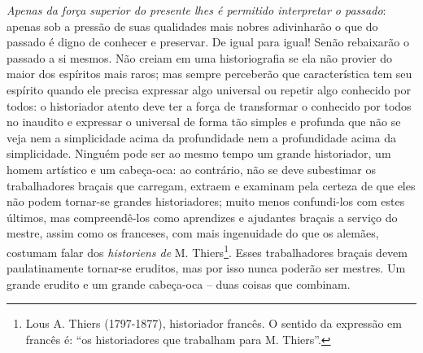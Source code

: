 \emph{Apenas da força superior do presente lhes é permitido interpretar
o passado}: apenas sob a pressão de suas qualidades mais nobres
adivinharão o que do passado é digno de conhecer e preservar. De igual
para igual! Senão rebaixarão o passado a si mesmos. Não creiam em uma
historiografia se ela não provier do maior dos espíritos mais raros; mas
sempre perceberão que característica tem seu espírito quando ele precisa
expressar algo universal ou repetir algo conhecido por todos: o
historiador atento deve ter a força de transformar o conhecido por todos
no inaudito e expressar o universal de forma tão simples e profunda que
não se veja nem a simplicidade acima da profundidade nem a profundidade
acima da simplicidade. Ninguém pode ser ao mesmo tempo um grande
historiador, um homem artístico e um cabeça-oca: ao contrário, não se
deve subestimar os trabalhadores braçais que carregam, extraem e
examinam pela certeza de que eles não podem tornar-se grandes
historiadores; muito menos confundi-los com estes últimos, mas
compreendê-los como aprendizes e ajudantes braçais a serviço do mestre,
assim como os franceses, com mais ingenuidade do que os alemães,
costumam falar dos \emph{historiens de} M. Thiers\footnote{Lous A.
  Thiers (1797-1877), historiador francês. O sentido da expressão em
  francês é: ``os historiadores que trabalham para M. Thiers''.}. Esses
trabalhadores braçais devem paulatinamente tornar-se eruditos, mas por
isso nunca poderão ser mestres. Um grande erudito e um grande cabeça-oca
-- duas coisas que combinam.

